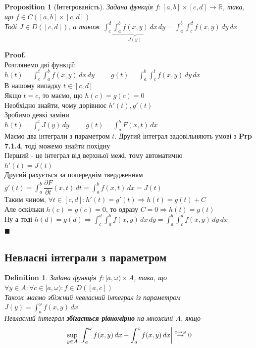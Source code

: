 \documentclass[a4paper, 14pt]{extarticle}
\def\huge{\displaystyle}
\def\bigline{\vspace{5mm}\\}
\theoremstyle{theoremdd}
\theoremstyle{theoremdd}
\newtheorem{definition}[theorem]{Definition}
\theoremstyle{theoremdd}
\theoremstyle{theoremdd}
\theoremstyle{theoremdd}
\newtheorem{proposition}[theorem]{Proposition}
\theoremstyle{theoremdd}
\theoremstyle{theoremdd}
\theoremstyle{theoremdd}
\newenvironment{pf}{\vspace*{-3mm} \textbf{Proof. \\}}{$\blacksquare$}
\def\departial#1#2{\dfrac{\partial {#1}}{\partial {#2}}}
\begin{document}
\begin{proposition}[Інтегрованість]
Задана функція $f: [a,b] \times [c,d] \to \mathbb{R}$, така, що $f \in C([a,b] \times [c,d])$\\
Тоді $J \in D([c,d])$, а також $\huge \int_c^d \underbrace{\int_a^b f(x,y)\,dx}_{J(y)}\,dy = \int_a^b \int_c^d f(x,y)\,dy \,dx$
\end{proposition}

\begin{pf}
Розглянемо дві функції: $h(t) = \huge \int_c^t \int_a^b f(x,y) \,dx \,dy \hspace{1cm} g(t) = \int_a^b \int_c^t f(x,y)\,dy\,dx$\\
В нашому випадку $t \in [c,d]$\\
Якщо $t =c$, то маємо, що $h(c) = g(c) = 0$\\
Необхідно знайти, чому дорівнює $h'(t), g'(t)$\\
Зробимо деякі заміни\\
$h(t) = \huge \int_c^t J(y) \,dy \hspace{1cm} g(t) = \int_a^b F(x,t)\,dx$\\
Маємо два інтеграли з параметром $t$. Другий інтеграл задовільняють умові з \textbf{Prp 7.1.4}, тоді можемо знайти похідну\\
Перший - це інтеграл від верхньої межі, тому автоматично\\
$h'(t) = J(t)$\\
Другий рахується за попереднім твердженням\\
$g'(t) = \huge \int_a^b \departial{F}{t}(x,t)\,dt = \huge \int_a^b f(x,t)\,dx = J(t)$\\
Таким чином, $\forall t \in [c,d]: h'(t) = g'(t) \Rightarrow h(t) = g(t) + C$\\
Але оскільки $h(c)=g(c)=0$, то одразу $C=0 \Rightarrow h(t) = g(t)$\\
Ну а тоді $h(d) = g(d) \Rightarrow \huge \int_c^d \int_a^b f(x,y)\,dx\,dy = \int_a^b \int_c^d f(x,y)\,dy \,dx$
\bigline
\end{pf}

\subsection{Невласні інтеграли з параметром}

\begin{definition}
Задана функція $f: [a,\omega) \times A$, така, що $\forall y \in A: \forall c \in [a,\omega): f\in D([a,c])$\\
Також маємо збіжний невласний інтеграл із параметром $J(y)= \huge \int_a^\omega f(x,y)\,dx$\\
Невласний інтеграл \textbf{збігається рівномірно} на множині $A$, якщо
\begin{align*}
\huge \sup_{y \in A} \abs{\int_a^\omega f(x,y)\,dx - \int_a^c f(x,y)\,dx} \overset{c \to \omega}{\to} 0
\end{align*}
\end{definition}
\end{document}
